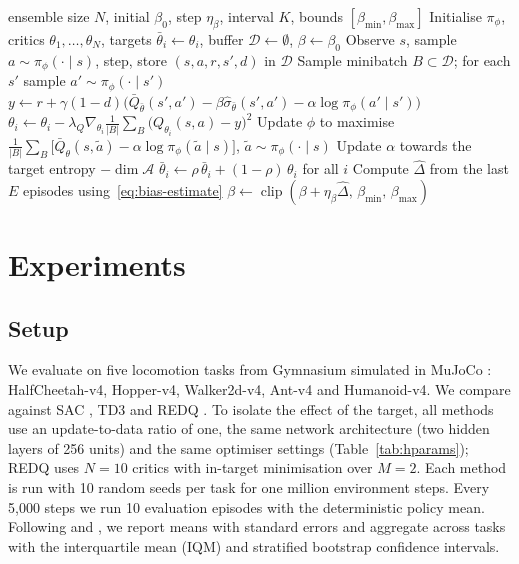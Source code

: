 \documentclass[10pt,twocolumn,letterpaper]{article}
\newcommand{\Qbar}{\bar{Q}}
\newcommand{\method}{\textsc{BACE}}
\begin{document}
\begin{algorithm}[t]
\caption{\method{} (Bias-Adaptive Critic Ensembles)}
\label{alg:bace}
\begin{algorithmic}[1]
\Require ensemble size $N$, initial $\beta_0$, step $\eta_\beta$, interval $K$, bounds $[\beta_{\min},\beta_{\max}]$
\State Initialise $\pi_\phi$, critics $\theta_1,\dots,\theta_N$, targets $\bar\theta_i\gets\theta_i$, buffer $\mathcal{D}\gets\emptyset$, $\beta\gets\beta_0$
  \State Observe $s$, sample $a\sim\pi_\phi(\cdot\mid s)$, step, store $(s,a,r,s',d)$ in $\mathcal{D}$
  \State Sample minibatch $B\subset\mathcal{D}$; for each $s'$ sample $a'\sim\pi_\phi(\cdot\mid s')$
  \State $y \gets r + \gamma(1-d)\bigl(\Qbar_{\bar\theta}(s',a') - \beta\hat\sigma_{\bar\theta}(s',a') - \alpha\log\pi_\phi(a'\mid s')\bigr)$
    \State $\theta_i \gets \theta_i - \lambda_Q\nabla_{\theta_i}\frac{1}{|B|}\sum_B\bigl(Q_{\theta_i}(s,a) - y\bigr)^2$
  \EndFor
  \State Update $\phi$ to maximise $\frac{1}{|B|}\sum_B\bigl[\Qbar_\theta(s,\tilde a) - \alpha\log\pi_\phi(\tilde a\mid s)\bigr]$, $\tilde a\sim\pi_\phi(\cdot\mid s)$
  \State Update $\alpha$ towards the target entropy $-\dim\mathcal{A}$
  \State $\bar\theta_i \gets \rho\,\bar\theta_i + (1-\rho)\,\theta_i$ for all $i$
    \State Compute $\hat\Delta$ from the last $E$ episodes using~\eqref{eq:bias-estimate}
    \State $\beta \gets \operatorname{clip}(\beta + \eta_\beta\hat\Delta,\,\beta_{\min},\,\beta_{\max})$
  \EndIf
\EndFor
\end{algorithmic}
\end{algorithm}

\section{Experiments}
\label{sec:experiments}

\subsection{Setup}

We evaluate on five locomotion tasks from Gymnasium \citep{towers2024} simulated in MuJoCo \citep{todorov2012}: HalfCheetah-v4, Hopper-v4, Walker2d-v4, Ant-v4 and Humanoid-v4. We compare against SAC \citep{haarnoja2018apps}, TD3 \citep{fujimoto2018} and REDQ \citep{chen2021}. To isolate the effect of the target, all methods use an update-to-data ratio of one, the same network architecture (two hidden layers of 256 units) and the same optimiser settings (Table~\ref{tab:hparams}); REDQ uses $N=10$ critics with in-target minimisation over $M=2$. Each method is run with 10 random seeds per task for one million environment steps. Every 5,000 steps we run 10 evaluation episodes with the deterministic policy mean. Following \citet{henderson2018} and \citet{agarwal2021}, we report means with standard errors and aggregate across tasks with the interquartile mean (IQM) and stratified bootstrap confidence intervals.
\end{document}
